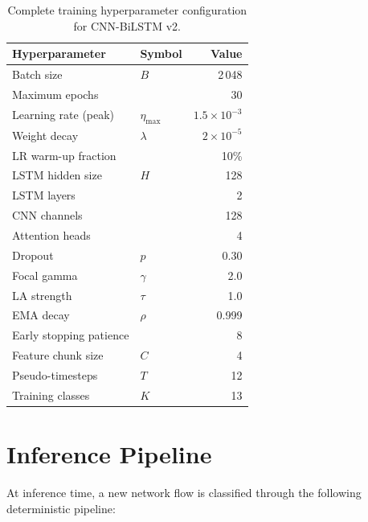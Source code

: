 \documentclass[12pt]{article}
\theoremstyle{plain}
\begin{document}
\begin{table}[H]
\centering
\caption{Complete training hyperparameter configuration for CNN-BiLSTM v2.}
\label{tab:hparams}
\begin{tabular}{llr}
\toprule
\textbf{Hyperparameter} & \textbf{Symbol} & \textbf{Value} \\
\midrule
Batch size & $B$ & 2\,048 \\
Maximum epochs & & 30 \\
Learning rate (peak) & $\eta_{\max}$ & $1.5 \times 10^{-3}$ \\
Weight decay & $\lambda$ & $2 \times 10^{-5}$ \\
LR warm-up fraction & & 10\% \\
LSTM hidden size & $H$ & 128 \\
LSTM layers & & 2 \\
CNN channels & & 128 \\
Attention heads & & 4 \\
Dropout & $p$ & 0.30 \\
Focal gamma & $\gamma$ & 2.0 \\
LA strength & $\tau$ & 1.0 \\
EMA decay & $\rho$ & 0.999 \\
Early stopping patience & & 8 \\
Feature chunk size & $C$ & 4 \\
Pseudo-timesteps & $T$ & 12 \\
Training classes & $K$ & 13 \\
\bottomrule
\end{tabular}
\end{table}

\newpage

\section{Inference Pipeline}
\label{sec:inference}

At inference time, a new network flow is classified through the following deterministic pipeline:
\end{document}

